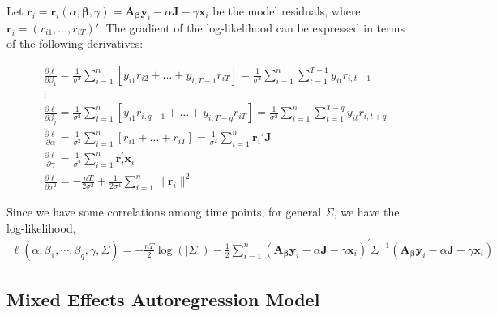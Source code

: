 \documentclass{article}
\begin{document}
\noindent Let $\mathbf{r}_{i}=\mathbf{r}_i(\alpha,\boldsymbol{\beta},\gamma)=\mathbf{A}_{\boldsymbol{\beta}} \mathbf{y}_i-\alpha \mathbf{J}-\gamma \mathbf{x}_i$ be the model residuals, where $\mathbf{r}_i=(r_{i1},\ldots,r_{iT})'$. The gradient of the log-likelihood can be expressed in terms of the following derivatives:

\begin{align*}
    & \frac{\partial \ell}{\partial \beta_1}=\frac{1}{\sigma^2} \sum_{i=1}^n[y_{i1}r_{i2}+\ldots+y_{i,T-1}r_{iT}]=\frac{1}{\sigma^2}\sum_{i=1}^n \sum_{t=1}^{T-1} y_{it} r_{i,t+1} \\
    & \vdots \\
    & \frac{\partial \ell}{\partial \beta_q}=\frac{1}{\sigma^2} \sum_{i=1}^n[y_{i1}r_{i,q+1}+\ldots+y_{i,T-q}r_{iT}]=\frac{1}{\sigma^2} \sum_{i=1}^n \sum_{t=1}^{T-q} y_{it} r_{i,t+q} \\
    & \frac{\partial \ell}{\partial \alpha} =\frac{1}{\sigma^2} \sum_{i=1}^n [r_{i1}+\ldots+r_{iT}]=\frac{1}{\sigma^2} \sum_{i=1}^n \boldsymbol{r}_i' \mathbf{J} \\
    &\frac{\partial \ell}{\partial \gamma} = \frac{1}{ \sigma^2}\sum_{i=1}^n\boldsymbol{r}_i^\prime\boldsymbol{x}_i \\
    & \frac{\partial \ell}{\partial \sigma^2} = -\frac{nT}{2 \sigma^2} + \frac{1}{2\sigma^4} \sum_{i=1}^n \|\mathbf{r}_i\|^2
\end{align*}







Since we have some correlations among time points, for general $\Sigma$, we have the log-likelihood,
\begin{align}
    \ell(\alpha,\beta_1,\cdots,\beta_q,\gamma,\Sigma) = -\frac{nT}{2}\log(|\Sigma|) - \frac{1}{2}\sum_{i=1}^n(\mathbf{A}_{\boldsymbol{\beta}}\mathbf{y}_i- \alpha \mathbf{J}-\gamma \mathbf{x}_i)^\prime\Sigma^{-1}(\mathbf{A}_{\boldsymbol{\beta}}\mathbf{y}_i- \alpha \mathbf{J}-\gamma \mathbf{x}_i)\nonumber
\end{align}




\subsection*{Mixed Effects Autoregression Model}
\end{document}
